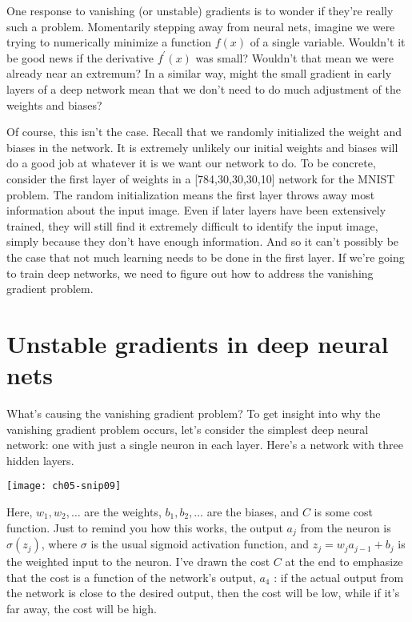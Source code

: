 One response to vanishing (or unstable) gradients is to wonder if they're really such a problem. Momentarily stepping away from neural nets, imagine we were trying to numerically minimize a function $f(x)$ of a single variable. Wouldn't it be good news if the derivative $f^\prime(x)$ was small? Wouldn't that mean we were already near an extremum? In a similar way, might the small gradient in early layers of a deep network mean that we don't need to do much adjustment of the weights and biases?

Of course, this isn't the case. Recall that we randomly initialized the weight and biases in the network. It is extremely unlikely our initial weights and biases will do a good job at whatever it is we want our network to do. To be concrete, consider the first layer of weights in a [784,30,30,30,10]
network for the MNIST problem. The random initialization means the first layer throws away most information about the input image. Even if later layers have been extensively trained, they will still find it extremely difficult to identify the input image, simply because they don't have enough information. And so it can't possibly be the case that not much learning needs to be done in the first layer. If we're going to train deep networks, we need to figure out how to address the vanishing gradient problem.


\section{Unstable gradients in deep neural nets}
\label{sec:Unstablegradientsindeepneuralnets}
What's causing the vanishing gradient problem? 
To get insight into why the vanishing gradient problem occurs, let's consider the simplest deep neural network: one with just a single neuron in each layer. Here's a network with three hidden layers.
\begin{marginfigure}
    \texttt{[image: ch05-snip09]}
    \end{marginfigure}
  
Here, $w_1,w_2,\ldots$ are the weights,  $b_1,b_2,\ldots$ are the biases, and $C$ is some cost function. Just to remind you how this works, the output $a_j$ from the  neuron is $\sigma\left(z_{j}\right)$, where $\sigma$ is the usual sigmoid activation function, and $z_{j}=w_{j} a_{j-1}+b_{j}$ is the weighted input to the neuron. I've drawn the cost $C$ at the end to emphasize that the cost is a function of the network's output, $a_4$ : if the actual output from the network is close to the desired output, then the cost will be low, while if it's far away, the cost will be high.

